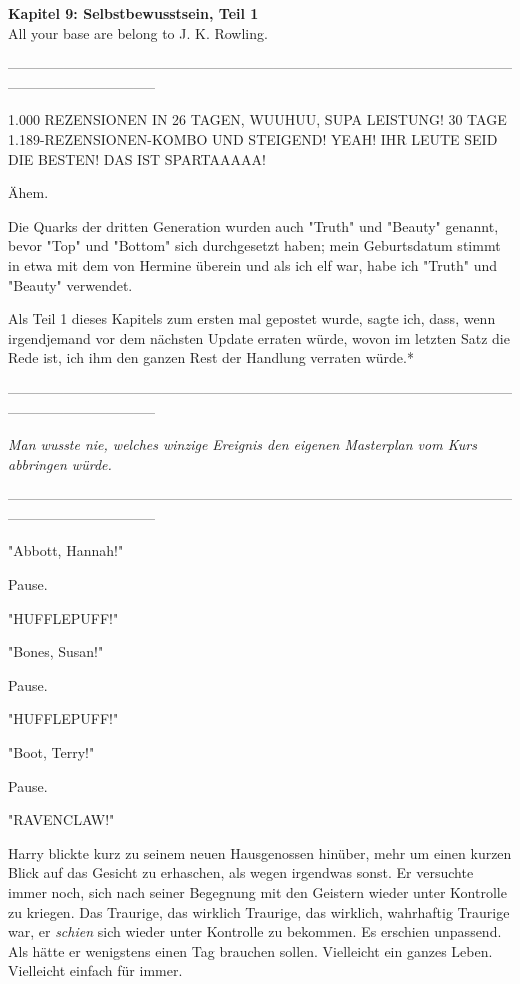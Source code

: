 

\hypertarget{selbstbewusstsein-teil-1}{%

\textbf{Kapitel 9: Selbstbewusstsein, Teil 1}\\

All your base are belong to J. K. Rowling.

--------------------------------------------------------------------------------------------------------------------------------------------

1.000 REZENSIONEN IN 26 TAGEN, WUUHUU, SUPA LEISTUNG! 30 TAGE 1.189-REZENSIONEN-KOMBO UND STEIGEND! YEAH! IHR LEUTE SEID DIE BESTEN! DAS IST SPARTAAAAA!

Ähem.

Die Quarks der dritten Generation wurden auch "Truth" und "Beauty" genannt, bevor "Top" und "Bottom" sich durchgesetzt haben; mein Geburtsdatum stimmt in etwa mit dem von Hermine überein und als ich elf war, habe ich "Truth" und "Beauty" verwendet.

Als Teil 1 dieses Kapitels zum ersten mal gepostet wurde, sagte ich, dass, wenn irgendjemand vor dem nächsten Update erraten würde, wovon im letzten Satz die Rede ist, ich ihm den ganzen Rest der Handlung verraten würde.*

--------------------------------------------------------------------------------------------------------------------------------------------

\emph{Man wusste nie, welches winzige Ereignis den eigenen Masterplan vom Kurs abbringen würde.}

--------------------------------------------------------------------------------------------------------------------------------------------

"Abbott, Hannah!"

Pause.

"HUFFLEPUFF!"

"Bones, Susan!"

Pause.

"HUFFLEPUFF!"

"Boot, Terry!"

Pause.

"RAVENCLAW!"

Harry blickte kurz zu seinem neuen Hausgenossen hinüber, mehr um einen kurzen Blick auf das Gesicht zu erhaschen, als wegen irgendwas sonst. Er versuchte immer noch, sich nach seiner Begegnung mit den Geistern wieder unter Kontrolle zu kriegen. Das Traurige, das wirklich Traurige, das wirklich, wahrhaftig Traurige war, er \emph{schien} sich wieder unter Kontrolle zu bekommen. Es erschien unpassend. Als hätte er wenigstens einen Tag brauchen sollen. Vielleicht ein ganzes Leben. Vielleicht einfach für immer.

}
